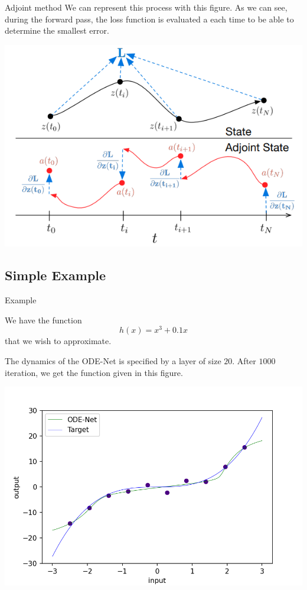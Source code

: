 \documentclass[11pt]{beamer}
\begin{document}
\begin{frame}{Adjoint method}
We can represent this process with this figure. As we can see, during the forward pass, the loss function is evaluated a each time to be able to determine the smallest error.

\begin{center}
\includegraphics[scale=0.6]{fig2.png}
\end{center}
\end{frame}


\subsection{Simple Example}
\begin{frame}{Example}


We have the function 
$$
h(x) = x^3 + 0.1x
$$
that we wish to approximate.

The dynamics of the ODE-Net is specified by a layer of size $20$. After $1000$ iteration, we get the function given in this figure.

\begin{center}
\includegraphics[scale=0.45]{ex_odenet.png}
\end{center}
\end{frame}
\end{document}
